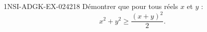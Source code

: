 \begin{exercice}{1NSI-ADGK-EX-024}{2}{18}
Démontrer que pour tous réels $x$ et $y$ :
\[ x^2 + y^2 \geq \frac{(x+y)^2}{2}. \]

\end{exercice}
